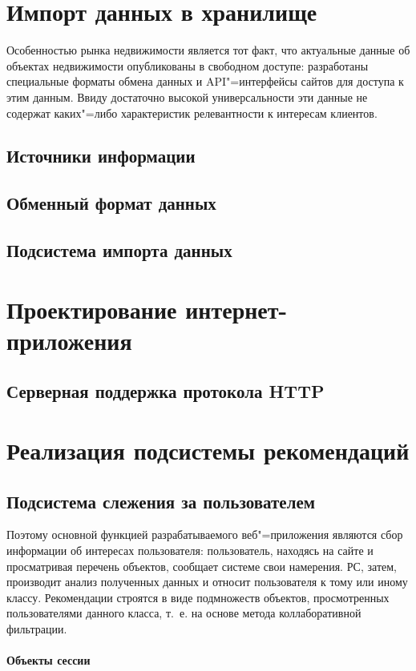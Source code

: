 \documentclass[a4paper,14pt,openany,final]{extreport} %
\begin{document}
\section{Импорт данных в хранилище}

Особенностью рынка недвижимости является тот факт, что актуальные данные об объектах недвижимости опубликованы в свободном доступе: разработаны специальные форматы обмена данных и API"=интерфейсы сайтов для доступа к этим данным. Ввиду достаточно высокой универсальности эти данные не содержат каких"=либо характеристик релевантности к интересам клиентов.


\subsection{Источники информации}
\subsection{Обменный формат данных}
\subsection{Подсистема импорта данных}
\section{Проектирование интернет-приложения}
\subsection{Серверная поддержка протокола HTTP}
\section{Реализация подсистемы рекомендаций}
\subsection{Подсистема слежения за пользователем}
Поэтому основной функцией разрабатываемого веб"=приложения являются сбор информации об интересах пользователя: пользователь, находясь на сайте и просматривая перечень объектов, сообщает системе свои намерения. РС, затем, производит анализ полученных данных и относит пользователя к тому или иному классу. Рекомендации строятся в виде подмножеств объектов, просмотренных пользователями данного класса, т.~е. на основе метода коллаборативной фильтрации.
\paragraph{Объекты сессии}
\end{document}

